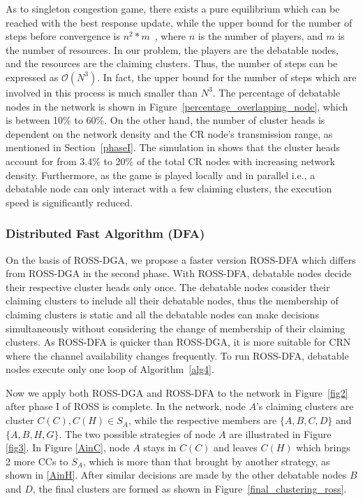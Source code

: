 \documentclass[times]{ettauth}
\newcommand{\ie}{i.e., }
\theoremstyle{mytheoremstyle}
\theoremstyle{mytheoremstyle}
\theoremstyle{mytheoremstyle}
\begin{document}
As to singleton congestion game, there exists a pure equilibrium which can be reached with the best response update, while the upper bound for the number of steps before convergence is $n^2*m$~\cite{Ackermann06purenash}, where $n$ is the number of players, and $m$ is the number of resources.
In our problem, the players are the debatable nodes, and the resources are the claiming clusters.
Thus, the number of steps can be expressed as $\mathcal{O}(N^3)$.
%
In fact, the upper bound for the number of steps which are involved in this process is much smaller than $N^3$.
The percentage of debatable nodes in the network is shown in Figure~\ref{percentage_overlapping_node}, which is between 10\% to 60\%.
On the other hand, the number of cluster heads is dependent on the network density and the CR node's transmission range, as mentioned in Section~\ref{phaseI}.
The simulation in \cite{robust_clustering_arxiv} shows that the cluster heads account for from 3.4\% to 20\% of the total CR nodes with increasing network density.
Furthermore, as the game is played locally and in parallel \ie a debatable node can only interact with a few claiming clusters, the execution speed is significantly reduced.


\subsubsection{Distributed Fast Algorithm (DFA)}
On the basis of ROSS-DGA, we propose a faster version ROSS-DFA which differs from ROSS-DGA in the second phase.
With ROSS-DFA, debatable nodes decide their respective cluster heads only once.
The debatable nodes consider their claiming clusters to include all their debatable nodes, thus the membership of claiming clusters is static and all the debatable nodes can make decisions simultaneously without considering the change of membership of their claiming clusters.
As ROSS-DFA is quicker than ROSS-DGA, it is more suitable for CRN where the channel availability changes frequently.
To run ROSS-DFA, debatable nodes execute only one loop of Algorithm~\ref{alg4}.

Now we apply both ROSS-DGA and ROSS-DFA to the network in Figure~\ref{fig2} after phase I of ROSS is complete.
In the network, node $A$'s claiming clusters are cluster $C(C), C(H)\in S_A$, while the respective members are $\{A,B,C,D\}$ and $\{A,B,H,G\}$. 
The two possible strategies of node $A$ are illustrated in Figure \ref{fig3}.
In Figure \ref{AinC}, node $A$ stays in $C(C)$ and leaves $C(H)$ which brings 2 more CCs to $S_A$, which is more than that brought by another strategy, as shown in \ref{AinH}.
After similar decisions are made by the other debatable nodes $B$ and $D$, the final clusters are formed as shown in Figure~\ref{final_clustering_ross}.
\end{document}
